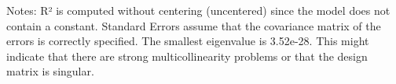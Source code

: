 Notes: \newline
 [1] R² is computed without centering (uncentered) since the model does not contain a constant. \newline
 [2] Standard Errors assume that the covariance matrix of the errors is correctly specified. \newline
 [3] The smallest eigenvalue is 3.52e-28. This might indicate that there are \newline
 strong multicollinearity problems or that the design matrix is singular.